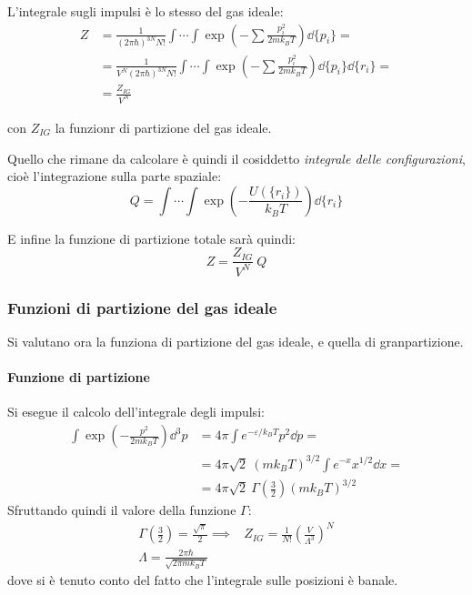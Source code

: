 L'integrale sugli impulsi è lo stesso del gas ideale:
\begin{align*}
Z &= \frac{1}{(2\pi \hbar)^{3N} N!}\int \cdots \int \exp \left(- \sum \frac{p_i^2}{2 m k_B T}\right) \dd\{p_i\} =\\ 
&= \frac{1}{V^N (2\pi \hbar)^{3N} N!}\int \cdots \int \exp \left(- \sum \frac{p_i^2}{2 m k_B T}\right) \dd\{p_i\} \dd\{r_i\} =\\
&= \frac{Z_{IG}}{V^N}
\end{align*}

\noindent con $Z_{IG}$ la funzionr di partizione del gas ideale.

Quello che rimane da calcolare è quindi il cosiddetto \textit{integrale delle configurazioni}, cioè l'integrazione sulla parte spaziale:
\begin{equation*}
	Q = \int \cdots \int \exp \left( - \frac{U(\{r_i\})}{k_B T}\right) \dd \{ r_i\}
\end{equation*}

E infine la funzione di partizione totale sarà quindi:
\begin{equation*}
	Z = \frac{Z_{IG}}{V^N}~Q
\end{equation*}

\subsubsection{Funzioni di partizione del gas ideale}
Si valutano ora la funziona di partizione del gas ideale, e quella di granpartizione.

\paragraph{Funzione di partizione} Si esegue il calcolo dell'integrale degli impulsi:
\begin{align*}
\int \exp \left(- \frac{p^2}{2 m k_B T}\right) \dd^3 p &= 4 \pi \int e^{- \varepsilon/ k_BT} p^2 \dd p =\\
&= 4 \pi \sqrt{2}~(mk_B T)^{3/2} \int e^{-x} x^{1/2} \dd x =\\
&= 4 \pi \sqrt{2}~\Gamma\left(\frac{3}{2}\right)(mk_B T)^{3/2}
\end{align*}
\noindent Sfruttando quindi il valore della funzione $\Gamma$:
\begin{align*}
\Gamma\left(\frac{3}{2}\right) = \frac{\sqrt{\pi}}{2} \implies& Z_{IG} = \frac{1}{N!}\left(\frac{V}{\Lambda^3}\right)^N\\
\Lambda = \frac{2\pi \hbar}{\sqrt{2 \pi m k_B T}}
\end{align*}
\noindent dove si è tenuto conto del fatto che l'integrale sulle posizioni è banale.

